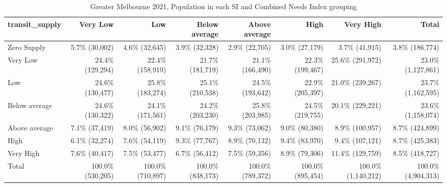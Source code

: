 \documentclass[preprint, 3p,
authoryear]{elsarticle} %
\begin{document}
\begin{table}

\caption{\label{tab:Greater_Melbourne_2021_needs_gap_population}Greater Melbourne 2021, Population in each SI and Combined Needs Index grouping}
\centering
\fontsize{7}{9}\selectfont
\begin{tabular}[t]{l|r|r|r|r|r|r|r}
\hline
transit\_supply & Very Low & Low & Below average & Above average & High & Very High & Total\\
\hline
Zero Supply & 5.7\%  (30,002) & 4.6\%  (32,645) & 3.9\%  (32,328) & 2.9\%  (22,705) & 3.0\%  (27,179) & 3.7\%    (41,915) & 3.8\%   (186,774)\\
\hline
Very Low & 24.4\% (129,294) & 22.4\% (158,919) & 21.7\% (181,719) & 21.1\% (166,490) & 22.3\% (199,467) & 25.6\%   (291,972) & 23.0\% (1,127,861)\\
\hline
Low & 24.6\% (130,477) & 25.8\% (183,274) & 25.1\% (210,538) & 24.5\% (193,642) & 22.9\% (205,397) & 21.0\%   (239,267) & 23.7\% (1,162,595)\\
\hline
Below average & 24.6\% (130,322) & 24.1\% (171,561) & 24.2\% (203,230) & 25.8\% (203,985) & 24.5\% (219,755) & 20.1\%   (229,221) & 23.6\% (1,158,074)\\
\hline
Above average & 7.1\%  (37,419) & 8.0\%  (56,902) & 9.1\%  (76,179) & 9.3\%  (73,062) & 9.0\%  (80,380) & 8.9\%   (100,957) & 8.7\%   (424,899)\\
\hline
High & 6.1\%  (32,274) & 7.6\%  (54,119) & 9.3\%  (77,767) & 8.9\%  (70,132) & 9.4\%  (83,970) & 9.4\%   (107,121) & 8.7\%   (425,383)\\
\hline
Very High & 7.6\%  (40,417) & 7.5\%  (53,477) & 6.7\%  (56,412) & 7.5\%  (59,356) & 8.9\%  (79,306) & 11.4\%   (129,759) & 8.5\%   (418,727)\\
\hline
Total & 100.0\% (530,205) & 100.0\% (710,897) & 100.0\% (838,173) & 100.0\% (789,372) & 100.0\% (895,454) & 100.0\% (1,140,212) & 100.0\% (4,904,313)\\
\hline
\end{tabular}
\end{table}
\end{document}
